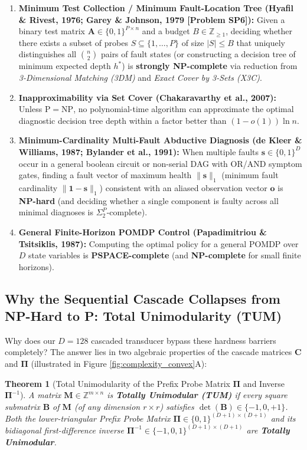 \documentclass[11pt,a4paper]{article}
\newtheorem{theorem}{Theorem}[section]
\theoremstyle{definition}
\theoremstyle{remark}
\begin{document}
\begin{enumerate}
    \item \textbf{Minimum Test Collection / Minimum Fault-Location Tree (Hyafil \& Rivest, 1976; Garey \& Johnson, 1979 [Problem SP6]):}
    Given a binary test matrix $\mathbf{A} \in \{0,1\}^{P \times n}$ and a budget $B \in \mathbb{Z}_{\ge 1}$, deciding whether there exists a subset of probes $S \subseteq \{1,\dots,P\}$ of size $|S| \le B$ that uniquely distinguishes all $\binom{n}{2}$ pairs of fault states (or constructing a decision tree of minimum expected depth $h^*$) is \textbf{strongly NP-complete} via reduction from \emph{3-Dimensional Matching (3DM)} and \emph{Exact Cover by 3-Sets (X3C)}.
    \item \textbf{Inapproximability via Set Cover (Chakaravarthy et al., 2007):}
    Unless $\mathrm{P} = \mathrm{NP}$, no polynomial-time algorithm can approximate the optimal diagnostic decision tree depth within a factor better than $(1 - o(1))\ln n$.
    \item \textbf{Minimum-Cardinality Multi-Fault Abductive Diagnosis (de Kleer \& Williams, 1987; Bylander et al., 1991):}
    When multiple faults $\bm{s} \in \{0,1\}^D$ occur in a general boolean circuit or non-serial DAG with OR/AND symptom gates, finding a fault vector of maximum health $\|\bm{s}\|_1$ (minimum fault cardinality $\| \mathbf{1} - \bm{s} \|_1$) consistent with an aliased observation vector $\bm{o}$ is \textbf{NP-hard} (and deciding whether a single component is faulty across all minimal diagnoses is $\Sigma_2^P$-complete).
    \item \textbf{General Finite-Horizon POMDP Control (Papadimitriou \& Tsitsiklis, 1987):}
    Computing the optimal policy for a general POMDP over $D$ state variables is \textbf{PSPACE-complete} (and \textbf{NP-complete} for small finite horizons).
\end{enumerate}

\subsection{Why the Sequential Cascade Collapses from NP-Hard to P: Total Unimodularity (TUM)}

Why does our $D=128$ cascaded transducer bypass these hardness barriers completely? The answer lies in two algebraic properties of the cascade matrices $\mathbf{C}$ and $\mathbf{\Pi}$ (illustrated in Figure \ref{fig:complexity_convex}A):

\begin{theorem}[Total Unimodularity of the Prefix Probe Matrix $\mathbf{\Pi}$ and Inverse $\mathbf{\Pi}^{-1}$]
A matrix $\mathbf{M} \in \mathbb{Z}^{m \times n}$ is \textbf{Totally Unimodular (TUM)} if every square submatrix $\mathbf{B}$ of $\mathbf{M}$ (of any dimension $r \times r$) satisfies $\det(\mathbf{B}) \in \{-1, 0, +1\}$. Both the lower-triangular Prefix Probe Matrix $\mathbf{\Pi} \in \{0,1\}^{(D+1)\times(D+1)}$ and its bidiagonal first-difference inverse $\mathbf{\Pi}^{-1} \in \{-1,0,1\}^{(D+1)\times(D+1)}$ are \textbf{Totally Unimodular}.
\end{theorem}
\end{document}
